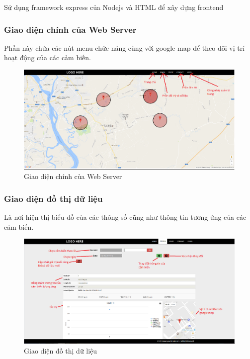 Sử dụng framework express của Nodejs và HTML để xây dựng frontend

\subsubsection*{Giao diện chính của Web Server}
Phần này chứa các nút menu chức năng cùng với google map để theo dõi vị trí hoạt động của các cảm biến.
	\begin{figure}[H]
		\centering    
		\includegraphics[width=1\textwidth]{webserver}
		\caption[Giao diện chính của Web Server]{Giao diện chính của Web Server}
		\label{fig:webserver}
	\end{figure}

\subsubsection*{Giao diện đồ thị dữ liệu}
Là nơi hiện thị biểu đồ của các thông số cũng như thông tin tương ứng của các cảm biến.
	\begin{figure}[H]
		\centering    
		\includegraphics[width=1\textwidth]{web_graph}
		\caption[Giao diện đồ thị dữ liệu]{Giao diện đồ thị dữ liệu}
		\label{fig:web_graph}
	\end{figure}


